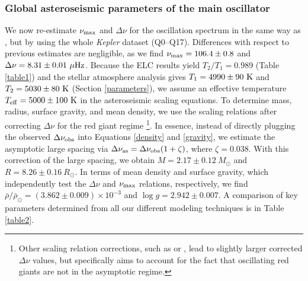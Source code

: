 \subsubsection{Global asteroseismic parameters of the main oscillator}
\label{subsubsec_main_osc}
We now re-estimate $\nu_{\rm{max}}$ and $\Delta \nu$ for the oscillation spectrum in the same way as \citet{gau14}, but by using the whole \textit{Kepler} dataset (Q0--Q17).  Differences with respect to previous estimates are negligible, as we find $\nu_{\rm{max}} = 106.4 \pm 0.8$ and $\Delta \nu = 8.31 \pm 0.01 \ \mu \rm{Hz}$. Because the ELC results yield $T_2/T_1=0.989$ (Table \ref{table1}) and the stellar atmosphere analysis gives $T_1 = 4990 \pm 90 \ \rm{K}$ and $T_2 = 5030 \pm 80 \ \rm{K}$ (Section \ref{parameters}), we assume an effective temperature $T_{\rm{eff}} = 5000 \pm 100 \ \rm{K}$ in the asteroseismic scaling equations. To determine mass, radius, surface gravity, and mean density, we use the scaling relations after correcting $\Delta \nu$ for the red giant regime \citep{mos13}\footnote{Other scaling relation corrections, such as \citet{cha11} or \citet{kal10}, lead to slightly larger corrected $\Delta \nu$ values, but \citet{mos13} specifically aims to account for the fact that oscillating red giants are not in the asymptotic regime.}. In essence, instead of directly plugging the observed $\Delta \nu_{\rm{obs}}$ into Equations \ref{density} and \ref{gravity}, we estimate the asymptotic large spacing via $\Delta \nu_{\rm{as}} = \Delta \nu_{\rm{obs}} (1 + \zeta)$, where $\zeta = 0.038$. With this correction of the large spacing, we obtain $M = 2.17 \pm 0.12 \ M_{\odot}$ and $R = 8.26 \pm 0.16 \ R_{\odot}$. In terms of mean density and surface gravity, which independently test the $\Delta \nu$  and $\nu_{\rm{max}}$ relations, respectively, we find $\bar{\rho}/\bar{\rho}_{\odot} = (3.862 \pm 0.009) \times 10 ^{-3}$ and $\log g = 2.942 \pm 0.007$. A comparison of key parameters determined from all our different modeling techniques is in Table \ref{table2}.

